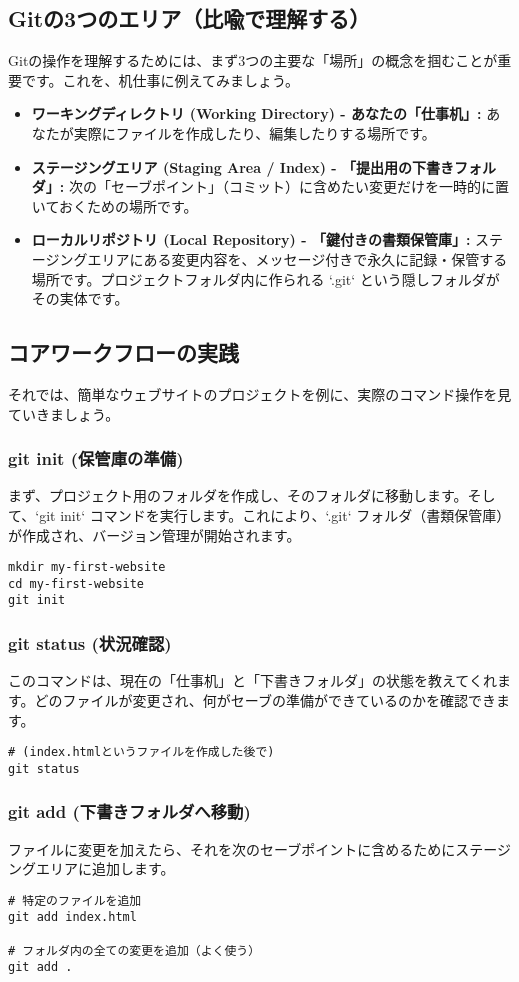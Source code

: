 \documentclass{ltjsarticle}
\begin{document}
\subsection{Gitの3つのエリア（比喩で理解する）}
Gitの操作を理解するためには、まず3つの主要な「場所」の概念を掴むことが重要です。これを、机仕事に例えてみましょう。
\begin{itemize}
    \item \textbf{ワーキングディレクトリ (Working Directory) - あなたの「仕事机」:} あなたが実際にファイルを作成したり、編集したりする場所です。
    \item \textbf{ステージングエリア (Staging Area / Index) - 「提出用の下書きフォルダ」:} 次の「セーブポイント」（コミット）に含めたい変更だけを一時的に置いておくための場所です。
    \item \textbf{ローカルリポジトリ (Local Repository) - 「鍵付きの書類保管庫」:} ステージングエリアにある変更内容を、メッセージ付きで永久に記録・保管する場所です。プロジェクトフォルダ内に作られる `.git` という隠しフォルダがその実体です。
\end{itemize}

\subsection{コアワークフローの実践}
それでは、簡単なウェブサイトのプロジェクトを例に、実際のコマンド操作を見ていきましょう。
\subsubsection{git init (保管庫の準備)}
まず、プロジェクト用のフォルダを作成し、そのフォルダに移動します。そして、`git init` コマンドを実行します。これにより、`.git` フォルダ（書類保管庫）が作成され、バージョン管理が開始されます。
\begin{verbatim}
mkdir my-first-website
cd my-first-website
git init
\end{verbatim}

\subsubsection{git status (状況確認)}
このコマンドは、現在の「仕事机」と「下書きフォルダ」の状態を教えてくれます。どのファイルが変更され、何がセーブの準備ができているのかを確認できます。
\begin{verbatim}
# (index.htmlというファイルを作成した後で)
git status
\end{verbatim}

\subsubsection{git add (下書きフォルダへ移動)}
ファイルに変更を加えたら、それを次のセーブポイントに含めるためにステージングエリアに追加します。
\begin{verbatim}
# 特定のファイルを追加
git add index.html

# フォルダ内の全ての変更を追加（よく使う）
git add .
\end{verbatim}
\end{document}
